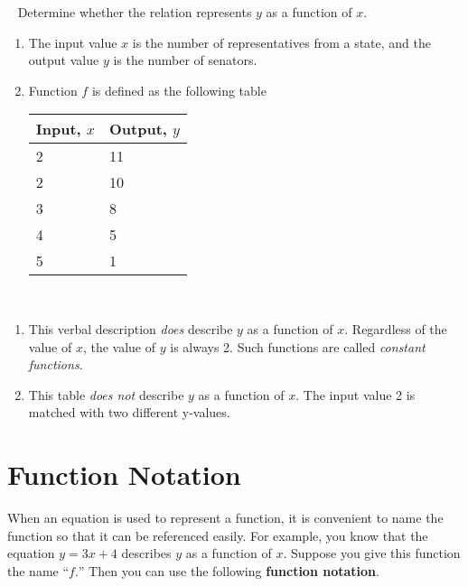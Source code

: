 \documentclass[11pt,fleqn,openany]{book} %
\begin{document}
\begin{example}~\newline
    Determine whether the relation represents $y$ as a function of $x$.

    \begin{enumerate}
\item The input value $x$ is the number of representatives from a state, and the output value $y$ is the number of senators.

\item Function $f$ is defined as the following table
\begin{table}[h]
    \centering
    \begin{tabular}{l l}
    \toprule
    \textbf{Input, $x$} & \textbf{Output, $y$}\\
    \midrule
    2 & 11 \\
    2 & 10 \\
    3 & 8 \\
    4 & 5 \\
    5 & 1 \\
    \bottomrule
    \end{tabular}
    \end{table}

\end{enumerate} 

    \begin{solution}~\newline
        \begin{enumerate}
         \item  This verbal description \textit{does} describe $y$ as a function of $x$. Regardless of the value of $x$, the value of $y$ is always 2. Such functions are called \textit{constant functions}.\\
         \item  This table \textit{does not} describe $y$ as a function of $x$. The input value 2 is matched with two different y-values.
    \end{enumerate}    
    \end{solution}

\end{example}

\section{Function Notation}

When an equation is used to represent a function, it is convenient 
to name the function so that it can be referenced easily. For example, 
you know that the equation $y=3x+4$ describes $y$ as a function of $x$. 
Suppose you give this function the name “$f.$” Then you can use the 
following \textbf{function notation}.
\end{document}
